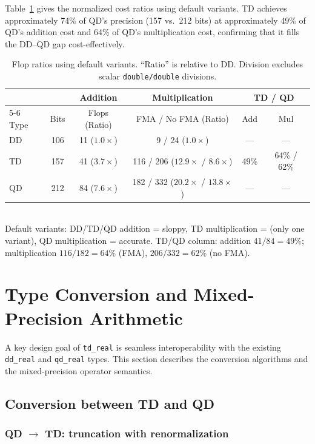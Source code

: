 \documentclass[11pt,a4paper]{article}
\begin{document}
Table~\ref{tab:flop-ratio} gives the normalized cost ratios using
default variants.  TD achieves approximately 74\% of QD's
precision (157 vs.\ 212 bits) at approximately 49\% of QD's
addition cost and 64\% of QD's multiplication cost, confirming
that it fills the DD--QD gap cost-effectively.

\begin{table}[h]
\centering
\caption{Flop ratios using default variants.  ``Ratio'' is
  relative to DD.  Division excludes scalar \texttt{double/double}
  divisions.}
\label{tab:flop-ratio}
\begin{tabular}{lccccc}
\toprule
      & & Addition & Multiplication & \multicolumn{2}{c}{TD / QD} \\
\cmidrule(lr){5-6}
Type  & Bits & Flops (Ratio) & FMA / No FMA (Ratio) & Add & Mul \\
\midrule
DD    & 106  & 11 ($1.0\times$) & 9 / 24 ($1.0\times$)
  & --- & --- \\
TD    & 157  & 41 ($3.7\times$) & 116 / 206 ($12.9\times$ / $8.6\times$)
  & 49\% & 64\% / 62\% \\
QD    & 212  & 84 ($7.6\times$) & 182 / 332 ($20.2\times$ / $13.8\times$)
  & --- & --- \\
\bottomrule
\end{tabular}
\\[2pt]
\footnotesize
Default variants: DD/TD/QD addition = sloppy,
TD multiplication = (only one variant),
QD multiplication = accurate.
TD/QD column: addition $41/84 = 49\%$;
multiplication $116/182 = 64\%$ (FMA), $206/332 = 62\%$ (no FMA).
\end{table}


\section{Type Conversion and Mixed-Precision Arithmetic}
\label{sec:mixed}

A key design goal of \texttt{td\_real} is seamless interoperability
with the existing \texttt{dd\_real} and \texttt{qd\_real} types.
This section describes the conversion algorithms and the
mixed-precision operator semantics.

\subsection{Conversion between TD and QD}

\subsubsection{QD $\to$ TD: truncation with renormalization}
\end{document}
